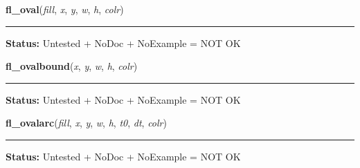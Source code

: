     \label{xformslib:library:fl_oval}

    \vspace{0.5ex}

\hspace{.8\funcindent}\begin{boxedminipage}{\funcwidth}

    \raggedright \textbf{fl\_oval}(\textit{fill}, \textit{x}, \textit{y}, \textit{w}, \textit{h}, \textit{colr})

    \vspace{-1.5ex}

    \rule{\textwidth}{0.5\fboxrule}
\setlength{\parskip}{2ex}
\setlength{\parskip}{1ex}
\textbf{Status:} Untested + NoDoc + NoExample = NOT OK



    \end{boxedminipage}

    \label{xformslib:library:fl_ovalbound}

    \vspace{0.5ex}

\hspace{.8\funcindent}\begin{boxedminipage}{\funcwidth}

    \raggedright \textbf{fl\_ovalbound}(\textit{x}, \textit{y}, \textit{w}, \textit{h}, \textit{colr})

    \vspace{-1.5ex}

    \rule{\textwidth}{0.5\fboxrule}
\setlength{\parskip}{2ex}
\setlength{\parskip}{1ex}
\textbf{Status:} Untested + NoDoc + NoExample = NOT OK



    \end{boxedminipage}

    \label{xformslib:library:fl_ovalarc}

    \vspace{0.5ex}

\hspace{.8\funcindent}\begin{boxedminipage}{\funcwidth}

    \raggedright \textbf{fl\_ovalarc}(\textit{fill}, \textit{x}, \textit{y}, \textit{w}, \textit{h}, \textit{t0}, \textit{dt}, \textit{colr})

    \vspace{-1.5ex}

    \rule{\textwidth}{0.5\fboxrule}
\setlength{\parskip}{2ex}
\setlength{\parskip}{1ex}
\textbf{Status:} Untested + NoDoc + NoExample = NOT OK



    \end{boxedminipage}

